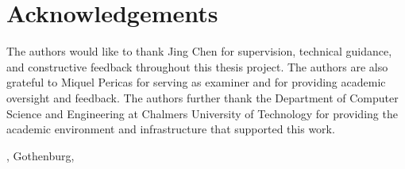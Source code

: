 \thispagestyle{plain}			%
\section*{Acknowledgements}
The authors would like to thank Jing Chen for supervision, technical guidance,
and constructive feedback throughout this thesis project. The authors are also
grateful to Miquel Pericas for serving as examiner and for providing academic
oversight and feedback. The authors further thank the Department of Computer
Science and Engineering at Chalmers University of Technology for providing the
academic environment and infrastructure that supported this work.

\vspace{1.5cm}
\hfill
\thesisAuthors, Gothenburg, \the\year

\newpage				%
\thispagestyle{empty}
\mbox{}
